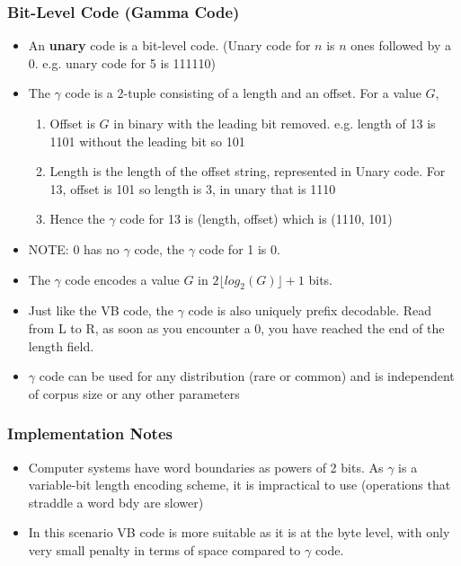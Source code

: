 \documentclass{article}
\begin{document}
\subsubsection{Bit-Level Code (Gamma Code)}
\begin{itemize}
    \item An \textbf{unary} code is a bit-level code. (Unary code for $n$ is $n$ ones followed by a 0. e.g. unary code for 5 is 111110)
    
    \item The $\gamma$ code is a 2-tuple consisting of a length and an offset. For a value $G$, 
    \begin{enumerate}
        \item Offset is $G$ in binary with the leading bit removed. e.g. length of 13 is 1101 without the leading bit so 101
        
        \item Length is the length of the offset string, represented in Unary code. For 13, offset is 101 so length is 3, in unary that is 1110
        
        \item Hence the $\gamma$ code for 13 is (length, offset) which is (1110, 101)
    \end{enumerate}
    
    \item NOTE: 0 has no $\gamma$ code, the $\gamma$ code for 1 is 0. 
    
    \item The $\gamma$ code encodes a value $G$ in $2 \lfloor log_2(G) \rfloor +1 $ bits. 
    
    \item Just like the VB code, the $\gamma$ code is also uniquely prefix decodable. Read from L to R, as soon as you encounter a 0, you have reached the end of the length field. 
    
    \item $\gamma$ code can be used for any distribution (rare or common) and is independent of corpus size or any other parameters
\end{itemize}

\subsubsection{Implementation Notes}
\begin{itemize}
    \item Computer systems have word boundaries as powers of 2 bits. As $\gamma$ is a variable-bit length encoding scheme, it is impractical to use (operations that straddle a word bdy are slower)
    
    \item In this scenario VB code is more suitable as it is at the byte level, with only very small penalty in terms of space compared to $\gamma$ code. 
\end{itemize}
\end{document}
